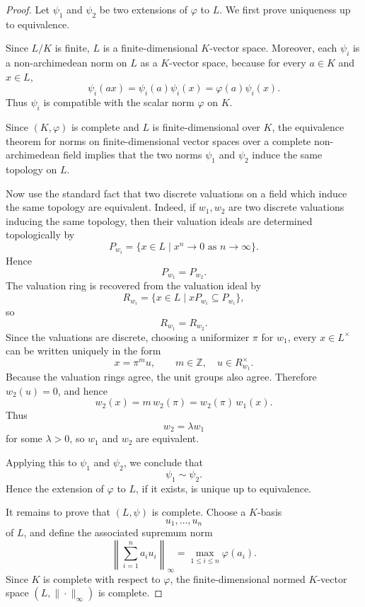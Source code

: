 \begin{proof}
    Let \(\psi_1\) and \(\psi_2\) be two extensions of \(\varphi\) to \(L\).
    We first prove uniqueness up to equivalence.

    Since \(L/K\) is finite, \(L\) is a finite-dimensional \(K\)-vector space.
    Moreover, each \(\psi_i\) is a non-archimedean norm on \(L\) as a
    \(K\)-vector space, because for every \(a\in K\) and \(x\in L\),
    \[
        \psi_i(ax)=\psi_i(a)\psi_i(x)=\varphi(a)\psi_i(x).
    \]
    Thus \(\psi_i\) is compatible with the scalar norm \(\varphi\) on \(K\).

    Since \((K,\varphi)\) is complete and \(L\) is finite-dimensional over \(K\),
    the equivalence theorem for norms on finite-dimensional vector spaces over a
    complete non-archimedean field implies that the two norms \(\psi_1\) and
    \(\psi_2\) induce the same topology on \(L\).

    Now use the standard fact that two discrete valuations on a field which induce
    the same topology are equivalent. Indeed, if \(w_1,w_2\) are two discrete
    valuations inducing the same topology, then their valuation ideals are determined
    topologically by
    \[
        P_{w_i}
        =
        \{x\in L\mid x^n\to 0 \text{ as } n\to \infty\}.
    \]
    Hence
    \[
        P_{w_1}=P_{w_2}.
    \]
    The valuation ring is recovered from the valuation ideal by
    \[
        R_{w_i}
        =
        \{x\in L\mid xP_{w_i}\subseteq P_{w_i}\},
    \]
    so
    \[
        R_{w_1}=R_{w_2}.
    \]
    Since the valuations are discrete, choosing a uniformizer \(\pi\) for \(w_1\),
    every \(x\in L^\times\) can be written uniquely in the form
    \[
        x=\pi^m u,
        \qquad
        m\in\mathbb{Z},\quad u\in R_{w_1}^{\times}.
    \]
    Because the valuation rings agree, the unit groups also agree. Therefore
    \(w_2(u)=0\), and hence
    \[
        w_2(x)=m\,w_2(\pi)=w_2(\pi)\,w_1(x).
    \]
    Thus
    \[
        w_2=\lambda w_1
    \]
    for some \(\lambda>0\), so \(w_1\) and \(w_2\) are equivalent.

    Applying this to \(\psi_1\) and \(\psi_2\), we conclude that
    \[
        \psi_1\sim \psi_2.
    \]
    Hence the extension of \(\varphi\) to \(L\), if it exists, is unique up to
    equivalence.

    It remains to prove that \((L,\psi)\) is complete. Choose a \(K\)-basis
    \[
        u_1,\dots,u_n
    \]
    of \(L\), and define the associated supremum norm
    \[
        \left\|\sum_{i=1}^{n}a_i u_i\right\|_{\infty}
        =
        \max_{1\leq i\leq n}\varphi(a_i).
    \]
    Since \(K\) is complete with respect to \(\varphi\), the finite-dimensional
    normed \(K\)-vector space \((L,\|\cdot\|_{\infty})\) is complete.


\end{proof}
